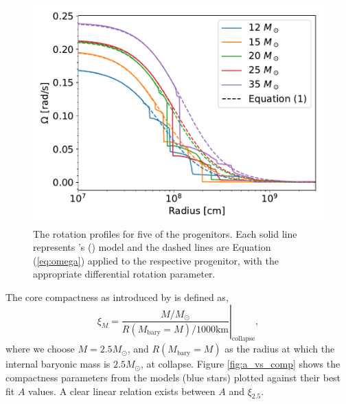 \documentclass[twocolumn,times]{aastex62}  %
\begin{document}
\begin{figure}[t]
    \centering
    \includegraphics[scale=0.45]{figures/omega_vs_r.pdf}
    \caption{The rotation profiles for five of the \citet{heger:2005} progenitors.  Each solid line represents \citeauthor{heger:2005}'s (\citeyear{heger:2005}) model and the dashed lines are Equation (\ref{eq:omega}) applied to the respective progenitor, with the appropriate differential rotation parameter.  }
    \label{fig:ovsr}
\end{figure}

The core compactness as introduced by \citet{oconnor:2011} is defined as,
\begin{equation}
    \xi_M = \left.\frac{M/M_{\odot}}{R(M_\mathrm{bary}=M)/1000 \text{km}}\right\vert_\mathrm{collapse} ,
\end{equation} 
where we choose $M = 2.5 M_\odot$, and $R(M_{\mathrm{bary}}=M) $ as the radius at which the internal baryonic mass is $2.5M_\odot$, at collapse.  
Figure \ref{fig:a_vs_comp} shows the compactness parameters from the \citet{heger:2005} models (blue stars) plotted against their best fit $A$ values.
A clear linear relation exists between $A$ and $\xi_{2.5}$.  
\end{document}

